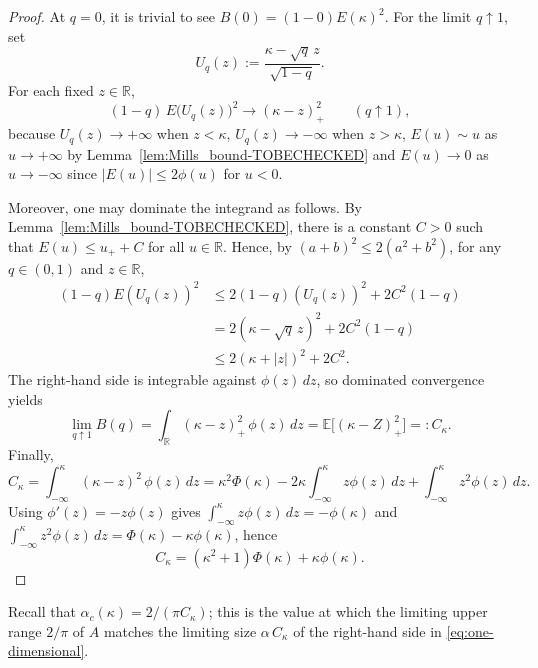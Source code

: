 \documentclass[11pt]{article}
\begin{document}
\begin{proof}
At $q=0$, it is trivial to see $B(0)=(1-0)E(\kappa)^2$. For the limit $q\uparrow 1$, set
\[U_q(z) :=\frac{\kappa-\sqrt{q}\,z}{\sqrt{1-q}}.
\]
For each fixed $z\in\mathbb R$,
\[
(1-q)\,E\bigl(U_q(z)\bigr)^2\to (\kappa-z)_+^2
\qquad (q\uparrow 1),
\]
because $U_q(z)\to+\infty$ when $z<\kappa$, $U_q(z)\to-\infty$ when $z>\kappa$,  $E(u)\sim u$ as $u\to+\infty$ by Lemma~\ref{lem:Mills_bound-TOBECHECKED} and $E(u) \to 0$ as $u\to-\infty$ since $|E(u)| \leq 2\phi(u)$ for $u<0$.

Moreover, one may dominate the integrand as follows. By Lemma~\ref{lem:Mills_bound-TOBECHECKED}, there is a constant
$C>0$ such that $E(u)\le u_+ + C$ for all $u\in\mathbb{R}$. Hence, by $(a+b)^2\leq 2(a^2+b^2)$, for any
$q\in(0,1)$ and $z\in\mathbb{R}$,
\begin{align*}
 (1-q)E(U_q(z))^2&\le 2(1-q)(U_q(z))^2+2C^2(1-q)\\
&=2(\kappa-\sqrt{q}\,z)^2+2C^2(1-q)\\
&\le 2(\kappa+|z|)^2+2C^2.
\end{align*}
The right-hand side is integrable against $\phi(z)\,dz$, so dominated convergence yields
\[
\lim_{q\uparrow 1}B(q)=\int_{\mathbb R}(\kappa-z)_+^2\,\phi(z)\,dz=\mathbb E\big[(\kappa-Z)_+^2\big]=:C_{\kappa}.
\]
Finally,
\[
C_{\kappa}=\int_{-\infty}^{\kappa}(\kappa-z)^2\,\phi(z)\,dz
=\kappa^2\Phi(\kappa)-2\kappa\int_{-\infty}^{\kappa}z\phi(z)\,dz+\int_{-\infty}^{\kappa}z^2\phi(z)\,dz.
\]
Using $\phi'(z)=-z\phi(z)$ gives $\int_{-\infty}^{\kappa}z\phi(z)\,dz=-\phi(\kappa)$ and $\int_{-\infty}^{\kappa}z^2\phi(z)\,dz=\Phi(\kappa)-\kappa\phi(\kappa)$, hence
\[
C_{\kappa}=(\kappa^2+1)\Phi(\kappa)+\kappa\phi(\kappa).
\]
\end{proof}

Recall that $\alpha_c(\kappa)=2/(\pi C_\kappa)$; this is the value at which the limiting upper range $2/\pi$ of $A$ matches the limiting size $\alpha\,C_\kappa$ of the right-hand side in \eqref{eq:one-dimensional}.
\end{document}
